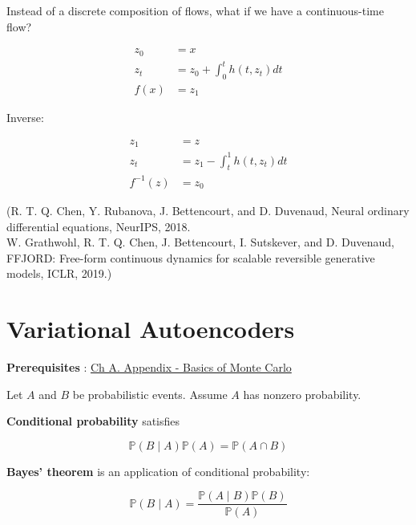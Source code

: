 \documentclass{report}
\begin{document}
\begin{definition}[10.34][FFJORD]
    Instead of a discrete composition of flows, what if we have a continuous-time flow?

    $$
    \begin{aligned}
    z_{0} & =x \\
    z_{t} & =z_{0}+\int_{0}^{t} h\left(t, z_{t}\right) d t \\
    f(x) & =z_{1}
    \end{aligned}
    $$

    Inverse:

    $$
    \begin{aligned}
    z_{1} & =z \\
    z_{t} & =z_{1}-\int_{t}^{1} h\left(t, z_{t}\right) d t \\
    f^{-1}(z) & =z_{0}
    \end{aligned}
    $$

    (R. T. Q. Chen, Y. Rubanova, J. Bettencourt, and D. Duvenaud, Neural ordinary differential equations, NeurIPS, 2018.\\
    W. Grathwohl, R. T. Q. Chen, J. Bettencourt, I. Sutskever, and D. Duvenaud, FFJORD: Free-form continuous dynamics for scalable reversible generative models, ICLR, 2019.)
\end{definition}

\chapter{Variational Autoencoders}

\textbf{Prerequisites} : \href{./13.md}{Ch A. Appendix - Basics of Monte Carlo}

\begin{concept}
    Let $A$ and $B$ be probabilistic events. Assume $A$ has nonzero probability.

    \textbf{Conditional probability} satisfies

    $$
    \mathbb{P}(B \mid A) \mathbb{P}(A)=\mathbb{P}(A \cap B)
    $$

    \textbf{Bayes' theorem} is an application of conditional probability:

    $$
    \mathbb{P}(B \mid A)=\frac{\mathbb{P}(A \mid B) \mathbb{P}(B)}{\mathbb{P}(A)}
    $$
\end{concept}
\end{document}
